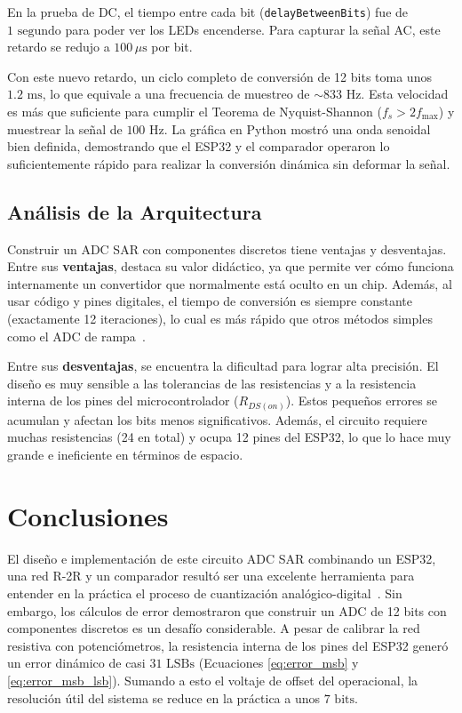 \documentclass[conference]{IEEEtran}
\begin{document}
En la prueba de DC, el tiempo entre cada bit (\texttt{delayBetweenBits}) fue de $1\text{ segundo}$ para poder ver los LEDs encenderse. Para capturar la señal AC, este retardo se redujo a $100\,\mu\text{s}$ por bit.

Con este nuevo retardo, un ciclo completo de conversión de 12 bits toma unos $1.2\text{ ms}$, lo que equivale a una frecuencia de muestreo de $\sim 833\text{ Hz}$. Esta velocidad es más que suficiente para cumplir el Teorema de Nyquist-Shannon ($f_s > 2f_{\text{max}}$) y muestrear la señal de $100\text{ Hz}$. La gráfica en Python mostró una onda senoidal bien definida, demostrando que el ESP32 y el comparador operaron lo suficientemente rápido para realizar la conversión dinámica sin deformar la señal.

\subsection{Análisis de la Arquitectura}
Construir un ADC SAR con componentes discretos tiene ventajas y desventajas. Entre sus \textbf{ventajas}, destaca su valor didáctico, ya que permite ver cómo funciona internamente un convertidor que normalmente está oculto en un chip. Además, al usar código y pines digitales, el tiempo de conversión es siempre constante (exactamente 12 iteraciones), lo cual es más rápido que otros métodos simples como el ADC de rampa~\cite{Pavan2024}.

Entre sus \textbf{desventajas}, se encuentra la dificultad para lograr alta precisión. El diseño es muy sensible a las tolerancias de las resistencias y a la resistencia interna de los pines del microcontrolador ($R_{DS(on)}$). Estos pequeños errores se acumulan y afectan los bits menos significativos. Además, el circuito requiere muchas resistencias (24 en total) y ocupa 12 pines del ESP32, lo que lo hace muy grande e ineficiente en términos de espacio.

\section{Conclusiones}

El diseño e implementación de este circuito ADC SAR combinando un ESP32, una red R-2R y un comparador resultó ser una excelente herramienta para entender en la práctica el proceso de cuantización analógico-digital~\cite{Mittal2023, Shtendel2023}. Sin embargo, los cálculos de error demostraron que construir un ADC de 12 bits con componentes discretos es un desafío considerable. A pesar de calibrar la red resistiva con potenciómetros, la resistencia interna de los pines del ESP32 generó un error dinámico de casi $31\text{ LSBs}$ (Ecuaciones \autoref{eq:error_msb} y \autoref{eq:error_msb_lsb}). Sumando a esto el voltaje de offset del operacional, la resolución útil del sistema se reduce en la práctica a unos $7\text{ bits}$.
\end{document}
